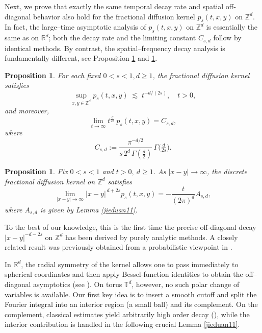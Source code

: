 \documentclass[reqno,12pt]{amsart}
\numberwithin{equation}{section}
\newtheorem{proposition}[theorem]{Proposition}
\begin{document}
Next, we prove that exactly the same temporal decay rate and spatial off‐diagonal behavior also hold for the fractional diffusion kernel \(p_s(t,x,y)\) on \(\mathbb{Z}^d\). In fact, the large–time asymptotic analysis of $p_s(t,x,y)$ on $\mathbb{Z}^d$ is essentially the same as on $\mathbb{R}^d$; both the decay rate and the limiting constant $C_{s,d}$ follow by identical methods.
By contrast, the spatial–frequency decay analysis is fundamentally different, see Proposition \ref{prop:large_time11} and \ref{prop:tail_asymptotic11}.


\begin{proposition}\label{prop:large_time11}
	For each fixed \(0<s<1, d\ge 1\), the fractional diffusion kernel satisfies
	\[
	\sup_{x,y\in\mathbb{Z}^d}p_s(t,x,y)\;\lesssim\;t^{-d/(2s)},\quad t>0,
	\]
	and moreover,
	\[
	\lim_{t\to\infty}t^{\frac{d}{2s}}\,p_s(t,x,y)
	= C_{s,d},
	\]
	where 
	$$
	C_{s,d}
	:=\frac{\pi^{-d/2}}{s\,2^d\,\Gamma(\tfrac d2)}\,
	\Gamma\!\bigl(\tfrac{d}{2s}\bigr).
	$$
\end{proposition}


\begin{proposition}\label{prop:tail_asymptotic11}
	Fix \(0<s<1\) and \(t>0,\:d\ge 1\).  As \(\lvert x-y\rvert\to\infty\), the discrete fractional diffusion kernel on \(\mathbb{Z}^d\) satisfies
	\[
	\lim\limits_{\lvert x-y\rvert\rightarrow \infty}\lvert x-y\rvert^{\,d+2s}p_s(t,x,y)=-\frac{t}{\left(2\pi\right)^d}A_{s,d},
	\]
	where $A_{s,d}$ is given by Lemma \ref{jieduan11}.
\end{proposition}



To the best of our knowledge, this is the first time the precise off‐diagonal decay 
\(\lvert x-y\rvert^{-d-2s}\) on \(\mathbb{Z}^d\) has been derived by purely analytic methods.  
A closely related result was previously obtained from a probabilistic viewpoint in \cite[Theorem 2.4]{bendikov2013alpha}.


	In $\mathbb{R}^d$, the radial symmetry of the kernel allows one to pass immediately to spherical coordinates and then apply Bessel‐function identities to obtain the off–diagonal asymptotics (see \cite[Theorem 2.1]{blumenthal1960some}).  On torus $\mathbb{T}^d$, however, no such polar change of variables is available.  Our first key idea is to insert a smooth cutoff and split the Fourier integral into an interior
	 region (a small ball) and its complement. On the complement, classical estimates yield arbitrarily high order decay (\cite[Theorem 3.2.9]{grafakos2008classical}), while the interior contribution is handled in the following crucial Lemma \ref{jieduan11}.
	 
\end{document}
